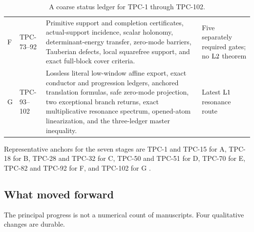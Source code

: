 \begin{table}[ht]
\begin{tabularx}{\textwidth}{@{}
  >{\raggedright\arraybackslash}p{0.9cm}
  >{\raggedright\arraybackslash}p{1.55cm}
  Y
  >{\raggedright\arraybackslash}p{2.0cm}@{}}
F & TPC-73--92 &
Primitive support and completion certificates, actual-support
incidence, scalar holonomy, determinant-energy transfer, zero-mode
barriers, Tauberian defects, local squarefree support, and exact
full-block cover criteria. &
Five separately required gates; no \(\mathrm{L2}\) theorem\\

G & TPC-93--102 &
Lossless literal low-window affine export, exact conductor and
progression ledgers, anchored translation formulas, safe zero-mode
projection, two exceptional branch returns, exact multiplicative
resonance spectrum, opened-atom linearization, and the three-ledger
master inequality. &
Latest \(\mathrm{L1}\) resonance route\\
\bottomrule
\end{tabularx}
\caption{A coarse status ledger for TPC-1 through TPC-102.}
\label{tab:century-ledger}
\end{table}

Representative anchors for the seven stages are TPC-1 and TPC-15
for A, TPC-18 for B, TPC-28 and TPC-32 for C, TPC-50 and TPC-51 for
D, TPC-70 for E, TPC-82 and TPC-92 for F, and TPC-102 for G
\cite{WangTPC1,WangTPC15,WangTPC18,WangTPC28,WangTPC32,WangTPC50,
WangTPC51,WangTPC70,WangTPC82,WangTPC92,WangTPC102}.

\subsection{What moved forward}

The principal progress is not a numerical count of manuscripts.  Four
qualitative changes are durable.

